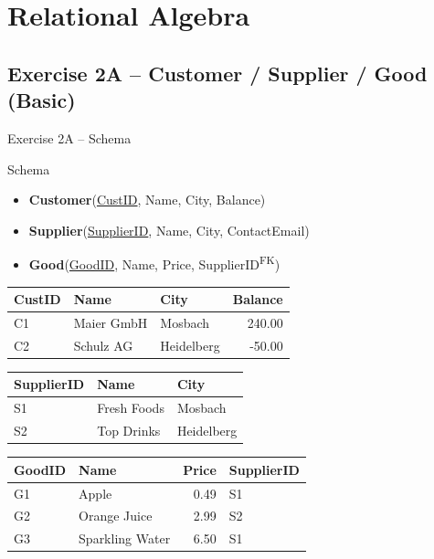 \documentclass[10pt]{beamer}
\begin{document}
\section{Relational Algebra}

\subsection{Exercise 2A -- Customer / Supplier / Good (Basic)}

\begin{frame}{Exercise 2A -- Schema}
  \begin{block}{Schema}
    \begin{itemize}
      \item \textbf{Customer}(\underline{CustID}, Name, City, Balance)
      \item \textbf{Supplier}(\underline{SupplierID}, Name, City, ContactEmail)
      \item \textbf{Good}(\underline{GoodID}, Name, Price, SupplierID\textsuperscript{FK})
    \end{itemize}
  \end{block}

  \vspace{4pt}
  \small
  \begin{tabular}{|l|l|l|r|}
    \hline
    \textbf{CustID} & \textbf{Name} & \textbf{City} & \textbf{Balance} \\
    \hline
    C1 & Maier GmbH & Mosbach & 240.00 \\
    C2 & Schulz AG & Heidelberg & -50.00 \\
    \hline
  \end{tabular}
  \quad
  \begin{tabular}{|l|l|l|}
    \hline
    \textbf{SupplierID} & \textbf{Name} & \textbf{City} \\
    \hline
    S1 & Fresh Foods & Mosbach \\
    S2 & Top Drinks & Heidelberg \\
    \hline
  \end{tabular}

  \vspace{4pt}
  \begin{tabular}{|l|l|r|l|}
    \hline
    \textbf{GoodID} & \textbf{Name} & \textbf{Price} & \textbf{SupplierID} \\
    \hline
    G1 & Apple & 0.49 & S1 \\
    G2 & Orange Juice & 2.99 & S2 \\
    G3 & Sparkling Water & 6.50 & S1 \\
    \hline
  \end{tabular}
\end{frame}
\end{document}
